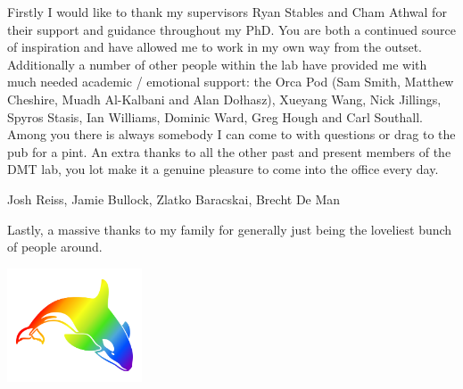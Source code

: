 \begin{acknowledgements}
	Firstly I would like to thank my supervisors Ryan Stables and Cham Athwal for their support and guidance throughout
	my PhD. You are both a continued source of inspiration and have allowed me to work in my own way from the outset.
	Additionally a number of other people within the lab have provided me with much needed academic / emotional support:
	the Orca Pod (Sam Smith, Matthew Cheshire, Muadh Al-Kalbani and Alan Do\l{}hasz), Xueyang Wang, Nick Jillings,
	Spyros Stasis, Ian Williams, Dominic Ward, Greg Hough and Carl Southall. Among you there is always somebody I can
	come to with questions or drag to the pub for a pint. An extra thanks to all the other past and present members of
	the DMT lab, you lot make it a genuine pleasure to come into the office every day.

	Josh Reiss, Jamie Bullock, Zlatko Baracskai, Brecht De Man

	Lastly, a massive thanks to my family for generally just being the loveliest bunch of people around.

	\begin{center}
		\includegraphics[width=0.3\textwidth]{Images/orca.pdf}
	\end{center}
\end{acknowledgements}

\tableofcontents
\listoffigures
\listoftables
{}
\printglossaries
\cleardoublepage
